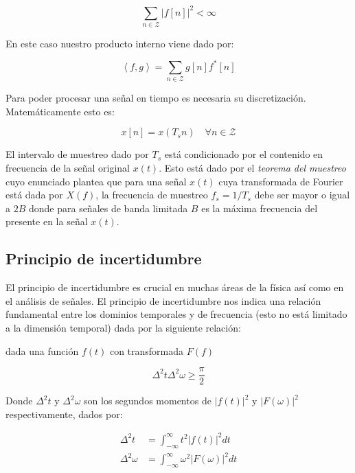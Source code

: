 \documentclass[conference]{IEEEtran}
\begin{document}
\begin{equation}
  \sum_{n \in \mathcal{Z}} \left|f[n]\right|^2 < \infty
\end{equation}

En este caso nuestro producto interno viene dado por:


\begin{equation}
  \left< f, g \right> = \sum_{n \in \mathcal{Z}} g[n]f^*[n]
\end{equation}



Para poder procesar una señal en tiempo es necesaria su discretización. Matemáticamente esto es:

\begin{equation}
  x[n] = x(T_s n) \quad \forall n \in \mathcal{Z}
\end{equation}


El intervalo de muestreo dado por $T_s$ está condicionado por el contenido en frecuencia de la señal original $x(t)$. Esto está dado por el \emph{teorema del muestreo}   \cite{proakis} cuyo enunciado plantea que para una señal $x(t)$ cuya transformada de Fourier está dada por $X(f)$, la frecuencia de muestreo $f_s = 1/T_s$ debe ser mayor o igual a $2B$ donde para señales de banda limitada $B$ es la máxima frecuencia del presente en la señal $x(t)$.


\subsection{Principio de incertidumbre}

El principio de incertidumbre es crucial en muchas áreas de la física así como en el análisis de señales. El principio de incertidumbre nos indica una relación fundamental entre los dominios temporales y de frecuencia (esto no está limitado a la dimensión temporal) dada por la siguiente relación:

dada una función $f(t)$ con transformada $F(f)$

\begin{equation}
  \Delta^2 t \Delta^2 \omega \geq \frac{\pi}{2} \label{eqn:incertidumbre}
\end{equation}

Donde $\Delta^2 t$ y $\Delta^2 \omega$ son los segundos momentos de $|f(t)|^2$ y $|F(\omega)|^2$ respectivamente, dados por:



\begin{align}
    \Delta^2 t &= \int_{-\infty}^\infty t^2 |f(t)|^2 dt\\
    \Delta^2 \omega &= \int_{-\infty}^\infty \omega^2 |F(\omega)|^2 dt
\end{align}
\end{document}
